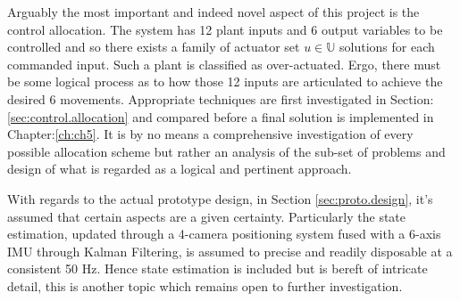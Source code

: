 \par
Arguably the most important and indeed novel aspect of this project is the control allocation. The system has 12 plant inputs and 6 output variables to be controlled and so there exists a family of actuator set $u\in\mathbb{U}$ solutions for each commanded input. Such a plant is classified as over-actuated. Ergo, there must be some logical process as to how those 12 inputs are articulated to achieve the desired 6 movements. Appropriate techniques are first investigated in Section:\ref{sec:control.allocation} and compared before a final solution is implemented in Chapter:\ref{ch:ch5}. It is by no means a comprehensive investigation of every possible allocation scheme but rather an analysis of the sub-set of problems and design of what is regarded as a logical and pertinent approach.
\par
With regards to the actual prototype design, in Section \ref{sec:proto.design}, it's assumed that certain aspects are a given certainty. Particularly the state estimation, updated through a 4-camera positioning system fused with a 6-axis IMU through Kalman Filtering, is assumed to precise and readily disposable at a consistent 50 Hz. Hence state estimation is included but is bereft of intricate detail, this is another topic which remains open to further investigation.
